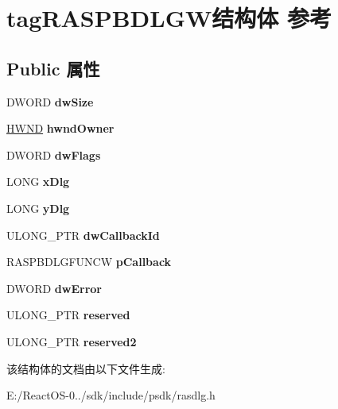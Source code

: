 \hypertarget{structtag_r_a_s_p_b_d_l_g_w}{}\section{tag\+R\+A\+S\+P\+B\+D\+L\+G\+W结构体 参考}
\label{structtag_r_a_s_p_b_d_l_g_w}
\subsection*{Public 属性}
\begin{DoxyCompactItemize}
\item 
\mbox{\label{structtag_r_a_s_p_b_d_l_g_w_a691d386b4eb959a16989500ca51b9723}} 
D\+W\+O\+RD {\bfseries dw\+Size}
\item 
\mbox{\label{structtag_r_a_s_p_b_d_l_g_w_a511d6d65bc9dd6b1b61aac1b0906caee}} 
\hyperlink{interfacevoid}{H\+W\+ND} {\bfseries hwnd\+Owner}
\item 
\mbox{\label{structtag_r_a_s_p_b_d_l_g_w_a3d27dc0fce93e11538aaf82a53e07752}} 
D\+W\+O\+RD {\bfseries dw\+Flags}
\item 
\mbox{\label{structtag_r_a_s_p_b_d_l_g_w_a80b376eebf2d8698363ca5565cf22c4d}} 
L\+O\+NG {\bfseries x\+Dlg}
\item 
\mbox{\label{structtag_r_a_s_p_b_d_l_g_w_ae127c53866460be6cad79f83f84a0bbc}} 
L\+O\+NG {\bfseries y\+Dlg}
\item 
\mbox{\label{structtag_r_a_s_p_b_d_l_g_w_ad4e9acfc97a4f03ea8cfd6a83476d5a8}} 
U\+L\+O\+N\+G\+\_\+\+P\+TR {\bfseries dw\+Callback\+Id}
\item 
\mbox{\label{structtag_r_a_s_p_b_d_l_g_w_a9861965c3f8db995f3d008b2e372c835}} 
R\+A\+S\+P\+B\+D\+L\+G\+F\+U\+N\+CW {\bfseries p\+Callback}
\item 
\mbox{\label{structtag_r_a_s_p_b_d_l_g_w_a46f39276cfe8a56f8c3b809643638735}} 
D\+W\+O\+RD {\bfseries dw\+Error}
\item 
\mbox{\label{structtag_r_a_s_p_b_d_l_g_w_ab1f0293cd1224fcff522b0b7a383b04f}} 
U\+L\+O\+N\+G\+\_\+\+P\+TR {\bfseries reserved}
\item 
\mbox{\label{structtag_r_a_s_p_b_d_l_g_w_a84c7bd3936dcf25fb63603b9507c9293}} 
U\+L\+O\+N\+G\+\_\+\+P\+TR {\bfseries reserved2}
\end{DoxyCompactItemize}


该结构体的文档由以下文件生成\+:\begin{DoxyCompactItemize}
\item 
E\+:/\+React\+O\+S-\/0../sdk/include/psdk/rasdlg.\+h\end{DoxyCompactItemize}
